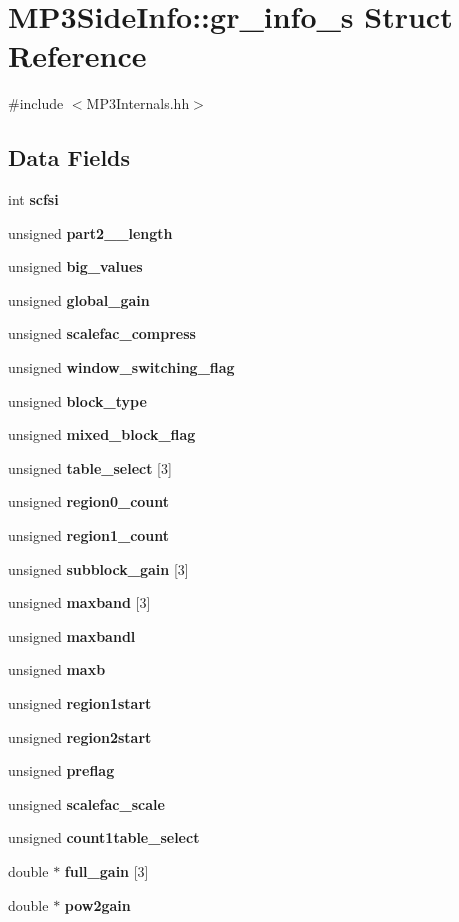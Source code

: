 \section{M\+P3\+Side\+Info\+:\+:gr\+\_\+info\+\_\+s Struct Reference}
\label{structMP3SideInfo_1_1gr__info__s}


{\ttfamily \#include $<$M\+P3\+Internals.\+hh$>$}

\subsection*{Data Fields}
\begin{DoxyCompactItemize}
\item 
int {\bf scfsi}
\item 
unsigned {\bf part2\+\_\+\_\+length}
\item 
unsigned {\bf big\+\_\+values}
\item 
unsigned {\bf global\+\_\+gain}
\item 
unsigned {\bf scalefac\+\_\+compress}
\item 
unsigned {\bf window\+\_\+switching\+\_\+flag}
\item 
unsigned {\bf block\+\_\+type}
\item 
unsigned {\bf mixed\+\_\+block\+\_\+flag}
\item 
unsigned {\bf table\+\_\+select} [3]
\item 
unsigned {\bf region0\+\_\+count}
\item 
unsigned {\bf region1\+\_\+count}
\item 
unsigned {\bf subblock\+\_\+gain} [3]
\item 
unsigned {\bf maxband} [3]
\item 
unsigned {\bf maxbandl}
\item 
unsigned {\bf maxb}
\item 
unsigned {\bf region1start}
\item 
unsigned {\bf region2start}
\item 
unsigned {\bf preflag}
\item 
unsigned {\bf scalefac\+\_\+scale}
\item 
unsigned {\bf count1table\+\_\+select}
\item 
double $\ast$ {\bf full\+\_\+gain} [3]
\item 
double $\ast$ {\bf pow2gain}
\end{DoxyCompactItemize}


